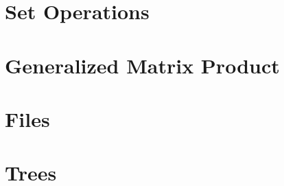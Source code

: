 \section{Set Operations}


\section{Generalized Matrix Product}


\section{Files}


\section{Trees}

